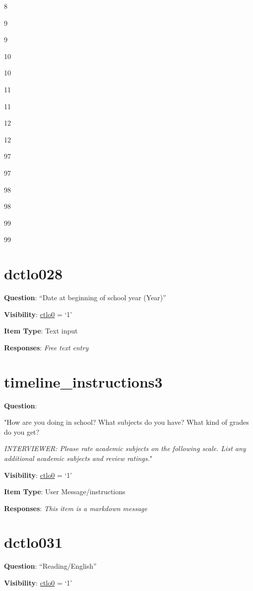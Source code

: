 \documentclass[]{book}
\begin{document}
8

9

9

10

10

11

11

12

12

97

97

98

98

99

99

\hypertarget{dctlo028}{%
\section{dctlo028}\label{dctlo028}}

\textbf{Question}: ``Date at beginning of school year (Year)''

\textbf{Visibility}: \protect\hyperlink{ctlo0}{ctlo0} = `1'

\textbf{Item Type}: Text input

\textbf{Responses}: \emph{Free text entry}

\hypertarget{timeline_instructions3}{%
\section{timeline\_instructions3}\label{timeline_instructions3}}

\textbf{Question}:

"How are you doing in school? What subjects do you have? What kind of grades do you get?

\emph{INTERVIEWER: Please rate academic subjects on the following scale. List any additional academic subjects and review ratings.}"

\textbf{Visibility}: \protect\hyperlink{ctlo0}{ctlo0} = `1'

\textbf{Item Type}: User Message/instructions

\textbf{Responses}: \emph{This item is a markdown message}

\hypertarget{dctlo031}{%
\section{dctlo031}\label{dctlo031}}

\textbf{Question}: ``Reading/English''

\textbf{Visibility}: \protect\hyperlink{ctlo0}{ctlo0} = `1'
\end{document}
